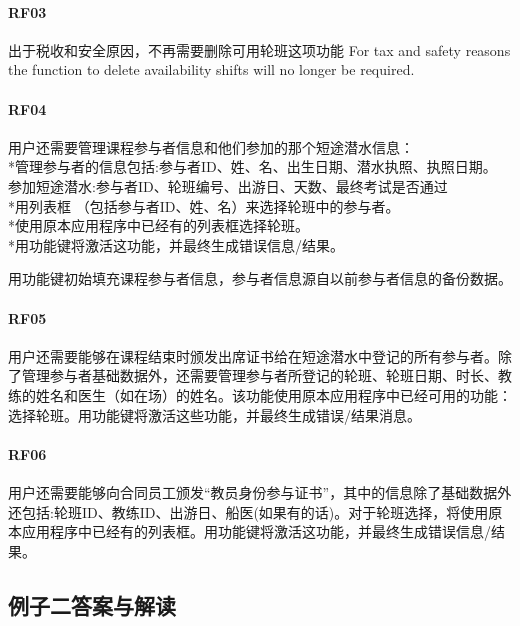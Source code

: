 \hypertarget{rf03-1}{%
\paragraph{RF03}\label{rf03-1}}

出于税收和安全原因，不再需要删除可用轮班这项功能 For tax and safety
reasons the function to delete availability shifts will no longer be
required.

\hypertarget{rf04-1}{%
\paragraph{RF04}\label{rf04-1}}

用户还需要管理课程参与者信息和他们参加的那个短途潜水信息：\\
*管理参与者的信息包括:参与者ID、姓、名、出生日期、潜水执照、执照日期。\\
参加短途潜水:参与者ID、轮班编号、出游日、天数、最终考试是否通过\\
*用列表框 （包括参与者ID、姓、名）来选择轮班中的参与者。\\
*使用原本应用程序中已经有的列表框选择轮班。\\
*用功能键将激活这功能，并最终生成错误信息/结果。

用功能键初始填充课程参与者信息，参与者信息源自以前参与者信息的备份数据。

\hypertarget{rf05-1}{%
\paragraph{RF05}\label{rf05-1}}

用户还需要能够在课程结束时颁发出席证书给在短途潜水中登记的所有参与者。除了管理参与者基础数据外，还需要管理参与者所登记的轮班、轮班日期、时长、教练的姓名和医生（如在场）的姓名。该功能使用原本应用程序中已经可用的功能：选择轮班。用功能键将激活这些功能，并最终生成错误/结果消息。

\hypertarget{rf06}{%
\paragraph{RF06}\label{rf06}}

用户还需要能够向合同员工颁发``教员身份参与证书''，其中的信息除了基础数据外还包括:轮班ID、教练ID、出游日、船医(如果有的话)。对于轮班选择，将使用原本应用程序中已经有的列表框。用功能键将激活这功能，并最终生成错误信息/结果。

\hypertarget{ux4f8bux5b50ux4e8cux7b54ux6848ux4e0eux89e3ux8bfb}{%
\subsection{例子二答案与解读}\label{ux4f8bux5b50ux4e8cux7b54ux6848ux4e0eux89e3ux8bfb}}

